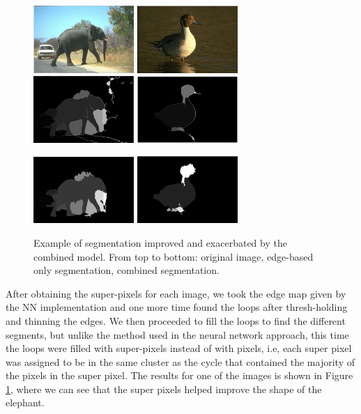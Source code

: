 \documentclass[10pt, twocolumn, twoside]{article}
\begin{document}
\begin{figure}[h]
    \centering
    \includegraphics[width=1.5in]{images/eleph.png}
    \includegraphics[width=1.5in]{images/43051.png}
    \includegraphics[width=1.5in]{images/eleph_NN.png}
    \includegraphics[width=1.5in]{images/43051_NN.png}
    
    \includegraphics[width=1.5in]{images/eleph_mix.png}
    \includegraphics[width=1.5in]{images/43051_mix.png}

    \caption{Example of segmentation improved and exacerbated by the combined model. From top to bottom: original image, edge-based only segmentation, combined segmentation.}
    \label{fig:reg37}
\end{figure}

After obtaining the super-pixels for each image, we took the edge map given by the NN implementation and one more time found the loops after thresh-holding and thinning the edges. We then proceeded to fill the loops to find the different segments, but unlike the method used in the neural network approach, this time the loops were filled with super-pixels instead of with pixels, i.e, each super pixel was assigned to be in the same cluster as the cycle that contained the majority of the pixels in the super pixel. The results for one of the images is shown in Figure \ref{fig:reg37}, where we can see that the super pixels helped improve the shape of the elephant.
\end{document}
